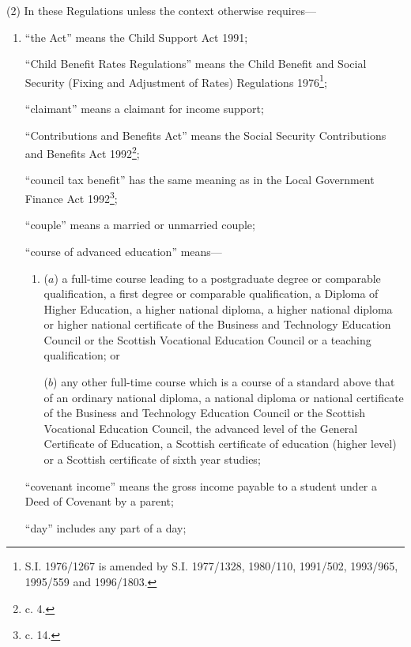 \documentclass[a4paper]{article}
\begin{document}
(2) In these Regulations unless the context otherwise requires—
\begin{enumerate}\item[]
“the Act” means the Child Support Act 1991;

“Child Benefit Rates Regulations” means the Child Benefit and Social Security (Fixing and Adjustment of Rates) Regulations 1976\footnote{\frenchspacing S.I. 1976/1267 is amended by S.I. 1977/1328, 1980/110, 1991/502, 1993/965, 1995/559 and 1996/1803.};

“claimant” means a claimant for income support;

“Contributions and Benefits Act” means the Social Security Contributions and Benefits Act 1992\footnote{ c. 4.};

“council tax benefit” has the same meaning as in the Local Government Finance Act 1992\footnote{ c. 14.};

“couple” means a married or unmarried couple;

“course of advanced education” means---
\begin{enumerate}\item[]
($a$)
a full-time course leading to a postgraduate degree or comparable qualification, a first degree or comparable qualification, a Diploma of Higher Education, a higher national diploma, a higher national diploma or higher national certificate of the Business and 
Technology %
Education Council or the Scottish Vocational Education Council or a teaching qualification; or

($b$)
any other full-time course which is a course of a standard above that of an ordinary national diploma, a national diploma or national certificate of the Business and 
Technology %
Education Council or the Scottish Vocational Education Council, the advanced level of the General Certificate of Education, a Scottish certificate of education (higher level) or a Scottish certificate of sixth year studies;
\end{enumerate}

“covenant income” means the gross income payable to a student under a Deed of Covenant by a parent;

“day” includes any part of a day;


\end{enumerate}
\end{document}
